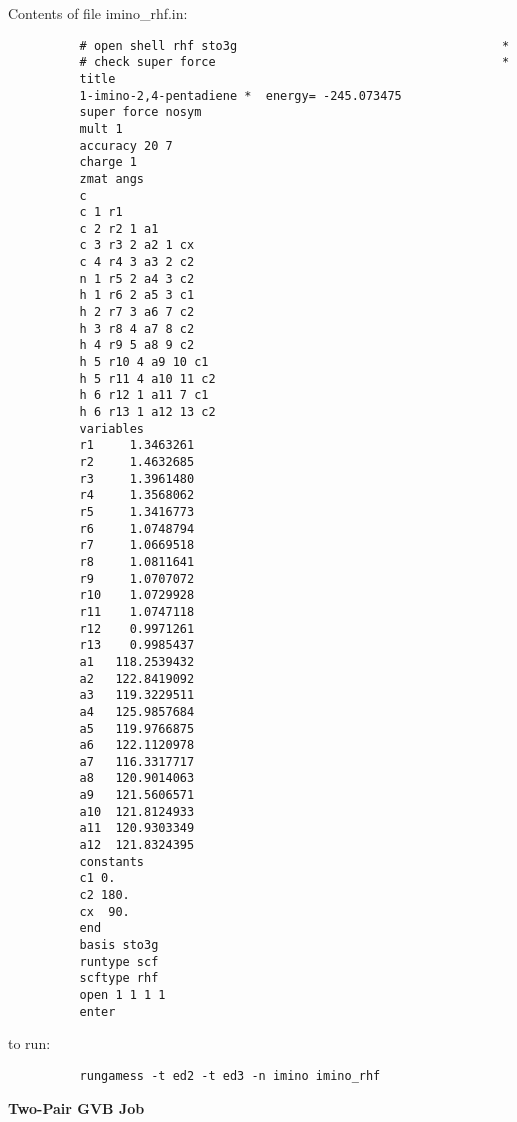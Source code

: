 \documentclass[11pt,fleqn]{article}
\begin{document}
Contents of file imino\_rhf.in:
{
\footnotesize
\begin{verbatim}
          # open shell rhf sto3g                                     *
          # check super force                                        *
          title
          1-imino-2,4-pentadiene *  energy= -245.073475
          super force nosym
          mult 1
          accuracy 20 7
          charge 1
          zmat angs
          c
          c 1 r1
          c 2 r2 1 a1
          c 3 r3 2 a2 1 cx
          c 4 r4 3 a3 2 c2
          n 1 r5 2 a4 3 c2
          h 1 r6 2 a5 3 c1
          h 2 r7 3 a6 7 c2
          h 3 r8 4 a7 8 c2
          h 4 r9 5 a8 9 c2
          h 5 r10 4 a9 10 c1
          h 5 r11 4 a10 11 c2
          h 6 r12 1 a11 7 c1 
          h 6 r13 1 a12 13 c2
          variables
          r1     1.3463261 
          r2     1.4632685
          r3     1.3961480 
          r4     1.3568062 
          r5     1.3416773 
          r6     1.0748794
          r7     1.0669518
          r8     1.0811641
          r9     1.0707072
          r10    1.0729928
          r11    1.0747118
          r12    0.9971261
          r13    0.9985437
          a1   118.2539432
          a2   122.8419092
          a3   119.3229511
          a4   125.9857684
          a5   119.9766875
          a6   122.1120978
          a7   116.3317717
          a8   120.9014063
          a9   121.5606571
          a10  121.8124933
          a11  120.9303349
          a12  121.8324395
          constants
          c1 0.
          c2 180.
          cx  90.
          end
          basis sto3g
          runtype scf
          scftype rhf
          open 1 1 1 1
          enter
\end{verbatim}
}
to run:
{
\footnotesize
\begin{verbatim}
          rungamess -t ed2 -t ed3 -n imino imino_rhf
\end{verbatim}
}
{\bf Two-Pair GVB Job}\\
\end{document}
